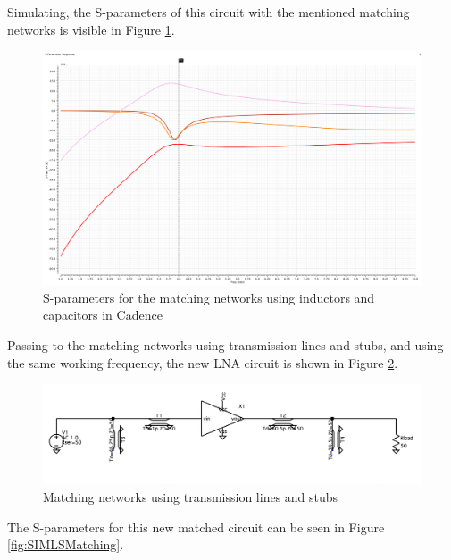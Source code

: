 Simulating, the S-parameters of this circuit with the mentioned matching networks is visible in Figure \ref{fig:CadenceLC}.

\begin{figure}[H]
    \centering
    \includegraphics*[scale = 0.3]{Images/LC_matching.png}
    \caption{S-parameters for the matching networks using inductors and capacitors in Cadence}
    \label{fig:CadenceLC}
\end{figure}

Passing to the matching networks using transmission lines and stubs, and using the same working frequency, the new LNA circuit is shown in Figure \ref{fig:SIMLSMatchingCircuit}.

\begin{figure}[H]
    \centering
    \includegraphics*[scale = 0.3]{Images/SIMLSmatchingcircuit.png}
    \caption{Matching networks using transmission lines and stubs}
    \label{fig:SIMLSMatchingCircuit}
\end{figure}

The S-parameters for this new matched circuit can be seen in Figure \ref{fig:SIMLSMatching}.

